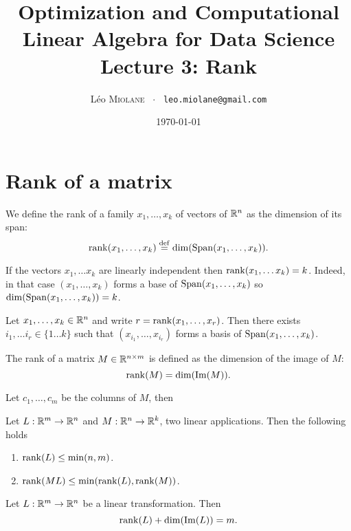 \documentclass[11pt,nocut]{article}
\title{\vspace{-2.0cm}%
	Optimization and Computational Linear Algebra for Data Science\\
	Lecture 3: Rank}
\author{Léo \textsc{Miolane} \ $\cdot$ \ \texttt{leo.miolane@gmail.com}}
\date{\today}
\begin{document}
\maketitle

\section{Rank of a matrix}

\begin{definition}
	We define the rank of a family $x_1, \dots, x_k$ of vectors of $\mathbb{R}^n$ as the dimension of its span:
	$$
	{{\rm rank}}(x_1, \dots, x_k) \overset{\rm def}{=} {{\rm dim}} ({{\rm Span}}(x_1, \dots, x_k)).
	$$
\end{definition}

If the vectors $x_1, \dots x_k$ are linearly independent then ${{\rm rank}}(x_1, \dots x_k) = k$. Indeed, in that case $(x_1, \dots, x_k)$ forms a base of ${{\rm Span}}(x_1, \dots, x_k)$ so ${{\rm dim}}({{\rm Span}}(x_1, \dots, x_k)) = k$.

\begin{proposition}
	Let $x_1, \dots, x_k \in \mathbb{R}^n$ and write $r = {{\rm rank}}(x_1, \dots, x_r)$. Then there exists $i_1, \dots i_r \in \{1 \dots k\}$ such that $(x_{i_1}, \dots, x_{i_r})$ forms a basis of ${{\rm Span}}(x_1, \dots, x_k)$.
\end{proposition}

\begin{definition}[Rank]
	The rank of a matrix $M \in \mathbb{R}^{n \times m}$ is defined as the dimension of the image of $M$:
	$$
	{{\rm rank}}(M) = {{\rm dim}}({{\rm Im}}(M)).
	$$
\end{definition}

Let $c_1, \dots, c_m$ be the columns of $M$, then 

\begin{proposition}
	Let $L: \mathbb{R}^m \to \mathbb{R}^n$ and $M: \mathbb{R}^n \to \mathbb{R}^k$, two linear applications. Then the following holds
	\begin{enumerate}[label=(\roman*)]
		\item ${{\rm rank}}(L) \leq \min(n,m)$.
		\item ${{\rm rank}}(ML) \leq \min({{\rm rank}}(L),{{\rm rank}}(M))$.
	\end{enumerate}
\end{proposition}

\begin{theorem}
	Let $L: \mathbb{R}^m \to \mathbb{R}^n$ be a linear transformation. Then
	$$
	{{\rm rank}}(L) + {{\rm dim}}({{\rm Im}}(L)) = m.
	$$
\end{theorem}



	\vspace{1cm}
	\centerline{}

%
%
\end{document}

